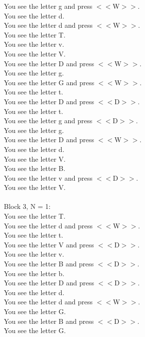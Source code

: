 \documentclass[pdflatex,sn-nature]{sn-jnl}%
\theoremstyle{thmstyleone}%
\theoremstyle{thmstyletwo}%
\theoremstyle{thmstylethree}%
\begin{document}
You see the letter g and press $<<$W$>>$. $~$\\ 
You see the letter d. $~$\\ 
You see the letter d and press $<<$W$>>$. $~$\\ 
You see the letter T. $~$\\ 
You see the letter v. $~$\\ 
You see the letter V. $~$\\ 
You see the letter D and press $<<$W$>>$. $~$\\ 
You see the letter g. $~$\\ 
You see the letter G and press $<<$W$>>$. $~$\\ 
You see the letter t. $~$\\ 
You see the letter D and press $<<$D$>>$. $~$\\ 
You see the letter t. $~$\\ 
You see the letter g and press $<<$D$>>$. $~$\\ 
You see the letter g. $~$\\ 
You see the letter D and press $<<$W$>>$. $~$\\ 
You see the letter d. $~$\\ 
You see the letter V. $~$\\ 
You see the letter B. $~$\\ 
You see the letter v and press $<<$D$>>$. $~$\\ 
You see the letter V. $~$\\ 
 $~$\\ 
Block 3, N = 1: $~$\\ 
You see the letter T. $~$\\ 
You see the letter d and press $<<$W$>>$. $~$\\ 
You see the letter t. $~$\\ 
You see the letter V and press $<<$D$>>$. $~$\\ 
You see the letter v. $~$\\ 
You see the letter B and press $<<$D$>>$. $~$\\ 
You see the letter b. $~$\\ 
You see the letter D and press $<<$D$>>$. $~$\\ 
You see the letter d. $~$\\ 
You see the letter d and press $<<$W$>>$. $~$\\ 
You see the letter G. $~$\\ 
You see the letter B and press $<<$D$>>$. $~$\\ 
You see the letter G. $~$\\ 
\end{document}
